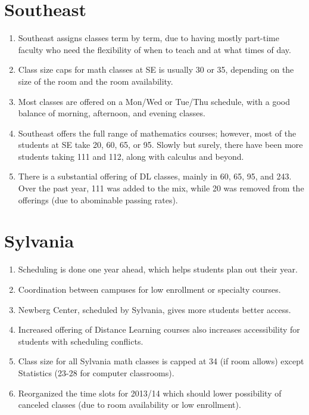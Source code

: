 \section*{Southeast}
\begin{enumerate}
  \item Southeast assigns classes term by term, due to having mostly part-time
    faculty who need the flexibility of when to teach and at what times of day.
  \item Class size caps for math classes at SE is usually 30 or 35, depending
    on the size of the room and the room availability.  
  \item Most classes are offered on a Mon/Wed or Tue/Thu schedule, with a good
    balance of morning, afternoon, and evening classes.
  \item Southeast offers the full range of mathematics courses; however, most
    of the students at SE take 20, 60, 65, or 95.  Slowly but surely, there
    have been more students taking 111 and 112, along with calculus and beyond.
  \item There is a substantial offering of DL classes, mainly in 60, 65, 95,
    and 243.  Over the past year, 111 was added to the mix, while 20 was
    removed from the offerings (due to abominable passing rates).
\end{enumerate}

\section*{Sylvania}
\begin{enumerate}
    \item  Scheduling is done one year ahead, which helps students plan out
      their year.
    \item  Coordination between campuses for low enrollment or specialty
      courses.
    \item  Newberg Center, scheduled by Sylvania, gives more students better
      access.
    \item  Increased offering of Distance Learning courses also increases
      accessibility for students with scheduling conflicts.
	\item  Class size for all Sylvania math classes is capped at 34 (if room allows) except
    Statistics (23-28 for computer classrooms).
	\item  Reorganized the time slots for 2013/14 which should lower possibility of canceled classes (due 
	to room availability or low enrollment).
\end{enumerate}

